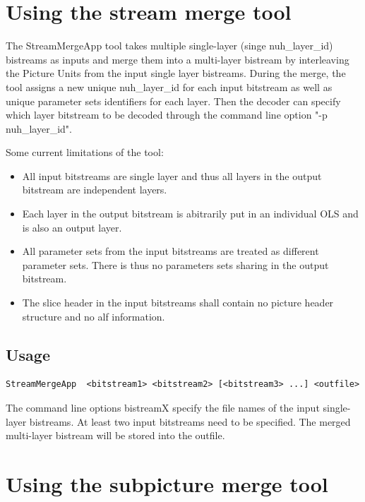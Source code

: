 ﻿\documentclass[a4paper,11pt]{jvetdoc}
\begin{document}
\section{Using the stream merge tool}
\label{sec:stream-merge-tool}

The StreamMergeApp tool takes multiple single-layer (singe nuh_layer_id) bistreams 
as inputs and merge them into a multi-layer bistream by interleaving the Picture Units
from the input single layer bistreams. During the merge, the tool assigns a new unique
nuh_layer_id for each input bitstream as well as unique parameter sets identifiers for each layer.
Then the decoder can specify which layer bitstream to be decoded through the command line option "-p nuh_layer_id".

Some current limitations of the tool:
\begin{itemize}
\item All input bitstreams are single layer and thus all layers in the output bitstream are independent layers.
\item Each layer in the output bitstream is abitrarily put in an individual OLS and is also an output layer.
\item All parameter sets from the input bitstreams are treated as different parameter sets. There is thus no parameters sets sharing in the output bitstream.
\item The slice header in the input bitstreams shall contain no picture header structure and no alf information.
\end{itemize}


\subsection{Usage}
\label{sec:stream-merge-usage}

\begin{verbatim}
StreamMergeApp 	<bitstream1> <bitstream2> [<bitstream3> ...] <outfile>
\end{verbatim}

The command line options bistreamX specify the file names of the input single-layer 
bistreams. At least two input bitstreams need to be specified. The merged multi-layer 
bistream will be stored into the outfile.




\section{Using the subpicture merge tool}
\label{sec:subpicture-merge-tool}
\end{document}
